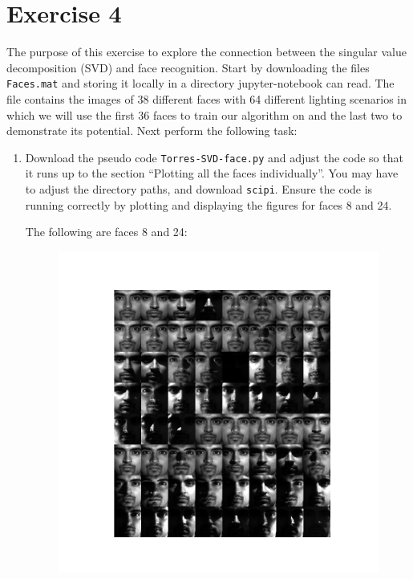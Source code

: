 \newcommand{\ts}{\textsuperscript}
\section{Exercise 4}
The purpose of this exercise to explore the connection between the singular
value decomposition (SVD) and face recognition. Start by downloading the
files \texttt{Faces.mat} and storing it locally in a directory
jupyter-notebook can read. The file contains the images of 38
different faces with 64 different lighting scenarios in which we will use
the first 36 faces to train our algorithm on and the last two to
demonstrate its potential. Next perform the following task:
\begin{enumerate}[label=\arabic*.]
    \item Download the pseudo code \texttt{Torres-SVD-face.py} and adjust
        the code so that it runs up to the section ``Plotting all the faces
        individually''. You may have to adjust the directory paths, and
        download \texttt{scipi}. Ensure the code is running correctly by
        plotting and displaying the figures for faces 8 and 24.
        \begin{mdframed}[style=MyFrame]
            The following are faces 8 and 24:
            \begin{figure}[H]
                \includegraphics[height=0.35\textheight]{../media/face-8.png}

\end{figure}
\end{mdframed}
\end{enumerate}

